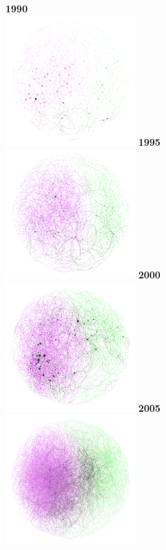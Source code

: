 \documentclass[10pt]{article}         %
\begin{document}
\begin{figure}[!htb]
    \textbf{1990}\\
    \includegraphics[width=5cm, height=5cm]{Fig2A1990.png}
  \endminipage\hfill
    \textbf{1995}\\
    \includegraphics[width=5cm, height=5cm]{Fig2A1995.png}
  \endminipage\hfill
    \textbf{2000}\\
    \includegraphics[width=5cm, height=5cm]{Fig2A2000.png}
  \endminipage\hfill
    \textbf{2005}\\
    \includegraphics[width=5cm, height=5cm]{Fig2A2005.png}

\end{figure}
\end{document}
